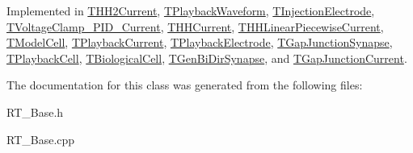 Implemented in \hyperlink{class_t_h_h2_current_a8b78e8e4d6abfe5bac5a8ac256b4e093}{T\+H\+H2\+Current}, \hyperlink{class_t_playback_waveform_a1fcb2c8d237e2418080fdefeb3e13f73}{T\+Playback\+Waveform}, \hyperlink{class_t_injection_electrode_a825ef8d17c3e3612aeb6b53c9e3aa539}{T\+Injection\+Electrode}, \hyperlink{class_t_voltage_clamp___p_i_d___current_a065e523cb852fbca91bd13e5a93bf293}{T\+Voltage\+Clamp\+\_\+\+P\+I\+D\+\_\+\+Current}, \hyperlink{class_t_h_h_current_a3529515fbe5fbcce14fedca3a8db5e04}{T\+H\+H\+Current}, \hyperlink{class_t_h_h_linear_piecewise_current_a9a240a941e2a98fc5bebf3ffb255541c}{T\+H\+H\+Linear\+Piecewise\+Current}, \hyperlink{class_t_model_cell_af69daf6390baa3fc7ba7c11aa0d726ad}{T\+Model\+Cell}, \hyperlink{class_t_playback_current_a28d0a767401ce8b53de441e83c6aae5c}{T\+Playback\+Current}, \hyperlink{class_t_playback_electrode_af870739aeec24862ed6333dc453951a1}{T\+Playback\+Electrode}, \hyperlink{class_t_gap_junction_synapse_ad1bfccafcf7a340e61d76e9ffa340b63}{T\+Gap\+Junction\+Synapse}, \hyperlink{class_t_playback_cell_a5cd1500e6e80753779d7dee74f4b84d2}{T\+Playback\+Cell}, \hyperlink{class_t_biological_cell_a35a6350ccd6c518944f15902edc1c608}{T\+Biological\+Cell}, \hyperlink{class_t_gen_bi_dir_synapse_ada612e93b0d7a24ea55201e364bdf7cd}{T\+Gen\+Bi\+Dir\+Synapse}, and \hyperlink{class_t_gap_junction_current_a778ffd1b6c6d72562ad03fa42ef6b55f}{T\+Gap\+Junction\+Current}.



The documentation for this class was generated from the following files\+:\begin{DoxyCompactItemize}
\item 
R\+T\+\_\+\+Base.\+h\item 
R\+T\+\_\+\+Base.\+cpp\end{DoxyCompactItemize}
